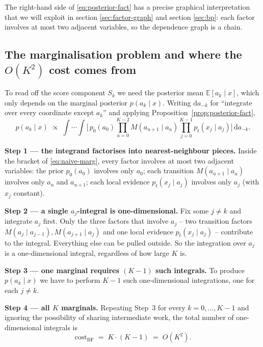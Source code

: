 \documentclass[11pt]{article}
\theoremstyle{definition}
\newcommand{\E}{\mathbb{E}}
\begin{document}
The right-hand side of \eqref{eq:posterior-fact} has a precise
graphical interpretation that we will exploit
in section \ref{sec:factor-graph} and section \ref{sec:bp}: each factor
involves at most two adjacent variables, so the dependence graph is a
chain.

\subsection{The marginalisation problem and where the \(O(K^2)\) cost comes from}\label{sec:marg-problem}

To read off the score component \(S_k\) we need the posterior mean
\(\E[a_k \mid x]\), which only depends on the marginal posterior
\(p(a_k \mid x)\). Writing \(\mathrm d a_{-k}\) for ``integrate over
every coordinate except \(a_k\)'' and applying
Proposition~\ref{prop:posterior-fact},
\begin{equation}\label{eq:naive-marg}
    p(a_k \mid x)
    \;\propto\;
    \int \cdots \int
        \biggl[\,
            p_0(a_0) \prod_{u = 0}^{K - 2} M(a_{u + 1} \mid a_u)
            \prod_{j = 0}^{K - 1} p_t(x_j \mid a_j)
        \biggr]\,
        \mathrm d a_{-k}.
\end{equation}

\begin{computation}
\textbf{Step 1 --- the integrand factorises into nearest-neighbour
pieces.} Inside the bracket of \eqref{eq:naive-marg}, every factor
involves at most two adjacent variables: the prior \(p_0(a_0)\)
involves only \(a_0\); each transition \(M(a_{u+1} \mid a_u)\)
involves only \(a_u\) and \(a_{u+1}\); each local evidence
\(p_t(x_j \mid a_j)\) involves only \(a_j\) (with \(x_j\) constant).

\textbf{Step 2 --- a single \(a_j\)-integral is one-dimensional.} Fix
some \(j \neq k\) and integrate \(a_j\) first. Only the three factors
that involve \(a_j\) -- two transition factors
\(M(a_j \mid a_{j-1}), M(a_{j+1} \mid a_j)\) and one local evidence
\(p_t(x_j \mid a_j)\) -- contribute to the integral. Everything else
can be pulled outside. So the integration over \(a_j\) is a
one-dimensional integral, regardless of how large \(K\) is.

\textbf{Step 3 --- one marginal requires \((K - 1)\) such integrals.}
To produce \(p(a_k \mid x)\) we have to perform \(K - 1\) such
one-dimensional integrations, one for each \(j \neq k\).

\textbf{Step 4 --- all \(K\) marginals.} Repeating Step~3 for every
\(k = 0, \dots, K - 1\) and ignoring the possibility of sharing
intermediate work, the total number of one-dimensional integrals is
\begin{equation}\label{eq:bf-cost}
    \mathrm{cost}_{\mathrm{BF}}
    \;=\; K \cdot (K - 1) \;=\; O(K^2).
\end{equation}
\end{computation}
\end{document}
